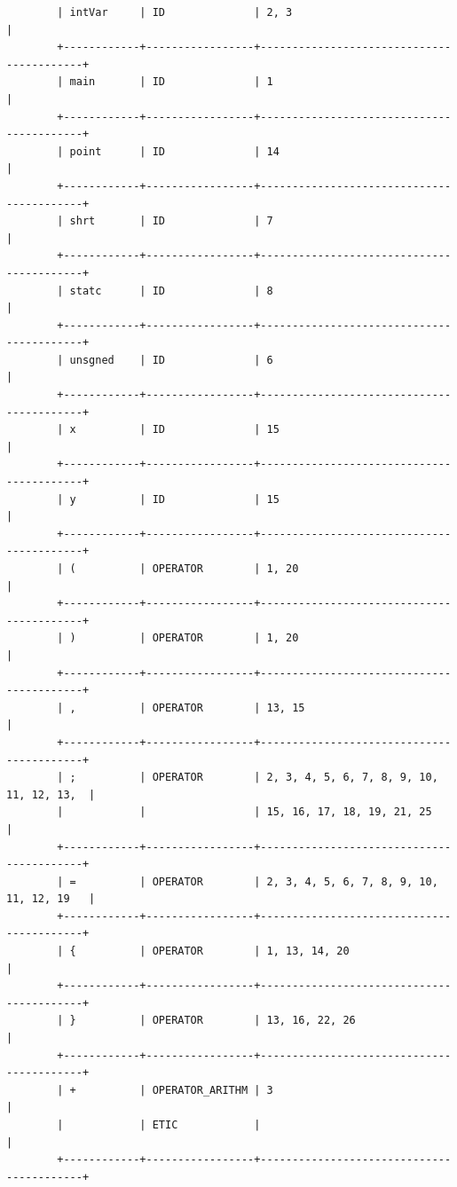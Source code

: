 \documentclass[a4paper,12pt]{article}
\begin{document}
\begin{flushleft}
\begin{verbatim}
		| intVar     | ID              | 2, 3                                     |
		+------------+-----------------+------------------------------------------+
		| main       | ID              | 1                                        |
		+------------+-----------------+------------------------------------------+
		| point      | ID              | 14                                       |
		+------------+-----------------+------------------------------------------+
		| shrt       | ID              | 7                                        |
		+------------+-----------------+------------------------------------------+
		| statc      | ID              | 8                                        |
		+------------+-----------------+------------------------------------------+
		| unsgned    | ID              | 6                                        |
		+------------+-----------------+------------------------------------------+
		| x          | ID              | 15                                       |
		+------------+-----------------+------------------------------------------+
		| y          | ID              | 15                                       |
		+------------+-----------------+------------------------------------------+
		| (          | OPERATOR        | 1, 20                                    |
		+------------+-----------------+------------------------------------------+
		| )          | OPERATOR        | 1, 20                                    |
		+------------+-----------------+------------------------------------------+
		| ,          | OPERATOR        | 13, 15                                   |
		+------------+-----------------+------------------------------------------+
		| ;          | OPERATOR        | 2, 3, 4, 5, 6, 7, 8, 9, 10, 11, 12, 13,  |
		|            |                 | 15, 16, 17, 18, 19, 21, 25               |
		+------------+-----------------+------------------------------------------+
		| =          | OPERATOR        | 2, 3, 4, 5, 6, 7, 8, 9, 10, 11, 12, 19   |
		+------------+-----------------+------------------------------------------+
		| {          | OPERATOR        | 1, 13, 14, 20                            |
		+------------+-----------------+------------------------------------------+
		| }          | OPERATOR        | 13, 16, 22, 26                           |
		+------------+-----------------+------------------------------------------+
		| +          | OPERATOR_ARITHM | 3                                        |
		|            | ETIC            |                                          |
		+------------+-----------------+------------------------------------------+

\end{verbatim}
\end{flushleft}
\end{document}

